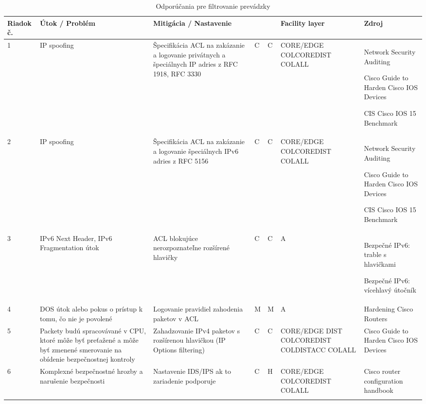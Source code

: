 \begin{longtable}[!htbp]{|C{2.5em}L{9em}L{9em}C{2em}C{2.5em}C{7.5em}L{10em}|}

	\hline
	\centering
	
	Riadok č.	&Útok / Problém	&Mitigácia / Nastavenie	& 	&	&Facility layer	&Zdroj\\
	\endhead
	

	 1	&IP spoofing	&Špecifikácia ACL na zakázanie a logovanie privátnych a špeciálnych IP adries z RFC 1918, RFC 3330	&C	&C	&CORE/EDGE
	COLCOREDIST
	COLALL	&Network Security Auditing \cite{Jackson2010}
	
	Cisco Guide to Harden Cisco IOS Devices \cite{Singh2018}
	
	CIS Cisco IOS 15 Benchmark \cite{CIS_DrTLsgXv24lxeIIM}\\
	2	&IP spoofing	&Špecifikácia ACL na zakázanie a logovanie špeciálnych IPv6 adries z RFC 5156	&C	&C	&CORE/EDGE
	COLCOREDIST
	COLALL	&Network Security Auditing \cite{Jackson2010}
	
	Cisco Guide to Harden Cisco IOS Devices \cite{Singh2018}
	
	CIS Cisco IOS 15 Benchmark \cite{CIS_DrTLsgXv24lxeIIM}\\
	 3	&IPv6 Next Header,
	IPv6 Fragmentation útok	&ACL blokujúce nerozpoznateľne rozšírené hlavičky	&C	&C	&A	&Bezpečné IPv6: trable s hlavičkami \cite{Podermanski1922015}
	
	Bezpečné IPv6: vícehlavý útočník \cite{Gregr2622015}\\
	4	&DOS útok alebo pokus o prístup k tomu, čo nie je povolené	&Logovanie pravidiel zahodenia paketov v ACL	&M	&M	&A	&Hardening Cisco Routers \cite{Akin2002}\\
	 5	&Packety budú spracovávané v CPU, ktoré môže byť preťažené a môže byť zmenené smerovanie na obídenie bezpečnostnej kontroly	&Zahadzovanie IPv4 paketov s rozšírenou hlavičkou (IP Options filtering)	&C	&C	&CORE/EDGE
	DIST
	COLCOREDIST
	COLDISTACC
	COLALL	&Cisco Guide to Harden Cisco IOS Devices \cite{Singh2018}\\
	6	&Komplexné bezpečnostné hrozby a narušenie bezpečnosti	&Nastavenie IDS/IPS ak to zariadenie podporuje	&C	&H	&CORE/EDGE COLCOREDIST
	COLALL	&Cisco router configuration handbook \cite{Hucaby2010}\\
	\hline
\caption{Odporúčania pre filtrovanie prevádzky}
\label{tab:filtering}%
\end{longtable}%

